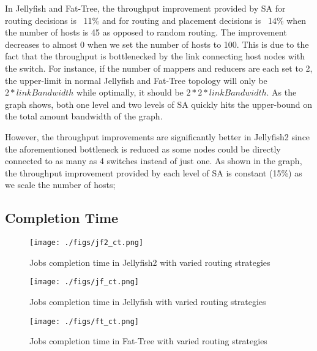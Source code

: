 In Jellyfish and Fat-Tree, the throughput improvement provided by SA
for routing decisions is ~11\% and for routing and placement decisions is
~14\% when the number of hosts is 45 as opposed to random routing. The
improvement decreases to almost 0 when we set the number of hosts to
100. This is due to the fact that the throughput is bottlenecked by the
link connecting host nodes with the switch. For instance, if the number of
mappers and reducers are each set to 2, the upper-limit in normal Jellyfish and
Fat-Tree topology will only be $2 * linkBandwidth$ while optimally, it should
be $2 * 2 * linkBandwidth$. As the graph shows, both one level and two levels
of SA quickly hits the upper-bound on the total amount bandwidth of the graph.

However, the throughput improvements are significantly better in Jellyfish2
since the aforementioned bottleneck is reduced as some nodes could be directly
connected to as many as 4 switches instead of just one. As shown in the graph,
the throughput improvement provided by each level of SA is constant (15\%) as
we scale the number of hosts;

 \newline {}

\subsection{Completion Time}
\label{sec:completionTime}

\begin{figure}
  \texttt{[image: ./figs/jf2\_ct.png]}
  \caption{Jobs completion time in Jellyfish2 with varied routing strategies}
  \label{fig:jf2_throughput}
\end{figure}

\begin{figure}
  \texttt{[image: ./figs/jf\_ct.png]}
  \caption{Jobs completion time in Jellyfish with varied routing strategies}
  \label{fig:jf_throughput}
\end{figure}

\begin{figure}
  \texttt{[image: ./figs/ft\_ct.png]}
  \caption{Jobs completion time in Fat-Tree with varied routing strategies}
  \label{fig:ft_throughput}
\end{figure}

